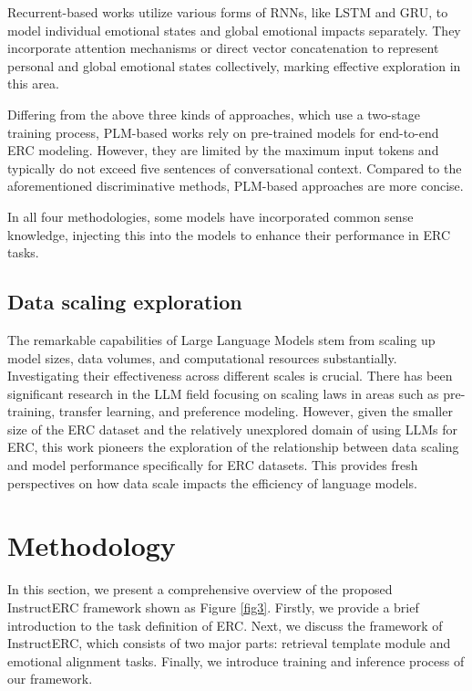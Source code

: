 \documentclass[conference]{IEEEtran}
\begin{document}
Recurrent-based works \cite{hu2023supervised,lei2023watch,majumder2019dialoguernn,hazarika2018icon,poria2017context} utilize various forms of RNNs, like LSTM and GRU, to model individual emotional states and global emotional impacts separately. They incorporate attention mechanisms or direct vector concatenation to represent personal and global emotional states collectively, marking effective exploration in this area.

Differing from the above three kinds of approaches, which use a two-stage training process, PLM-based works \cite{shen2021dialogxl,hu-etal-2022-unimse,kim2021emoberta} rely on pre-trained models for end-to-end ERC modeling. However, they are limited by the maximum input tokens and typically do not exceed five sentences of conversational context. Compared to the aforementioned discriminative methods, PLM-based approaches are more concise.

In all four methodologies, some models\cite{freudenthaler2022ki,ghosal2020cosmic,zhong2019knowledge,zhu2021kat,li2021past} have incorporated common sense knowledge, injecting this into the models to enhance their performance in ERC tasks.



\subsection{Data scaling exploration}

The remarkable capabilities of Large Language Models stem from scaling up model sizes, data volumes, and computational resources substantially. Investigating their effectiveness across different scales is crucial. There has been significant research in the LLM field focusing on scaling laws in areas such as pre-training\cite{anil2023palm}, transfer learning\cite{hoffmann2022training}, and preference modeling\cite{chronopoulou2019embarrassingly}. However, given the smaller size of the ERC dataset and the relatively unexplored domain of using LLMs for ERC, this work pioneers the exploration of the relationship between data scaling and model performance specifically for ERC datasets. This provides fresh perspectives on how data scale impacts the efficiency of language models.

\section{Methodology}
In this section, we present a comprehensive overview of the proposed InstructERC framework shown as Figure \ref{fig3}. Firstly, we provide a brief introduction to the task definition of ERC. Next, we discuss the framework
of InstructERC, which consists of two major parts:
retrieval template module and emotional alignment tasks.
Finally, we introduce training and inference process of our framework.
\end{document}
